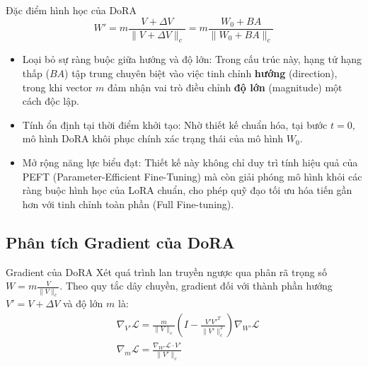 \documentclass[11pt,aspectratio=169]{beamer}
\begin{document}
\begin{frame}[t]{Đặc điểm hình học của DoRA}
$$W' = m \frac{V + \Delta V}{\|V + \Delta V\|_c} = m \frac{W_0 + BA}{\|W_0 + BA\|_c}$$
\begin{itemize}
\item Loại bỏ sự ràng buộc giữa hướng và độ lớn: Trong cấu trúc này, hạng tử hạng thấp ($BA$) tập trung chuyên biệt vào việc tinh chỉnh \textbf{hướng} (direction), trong khi vector $m$ đảm nhận vai trò điều chỉnh \textbf{độ lớn} (magnitude) một cách độc lập.

\item Tính ổn định tại thời điểm khởi tạo: Nhờ thiết kế chuẩn hóa, tại bước $t=0$, mô hình DoRA khôi phục chính xác trạng thái của mô hình $W_0$.

\item Mở rộng năng lực biểu đạt: Thiết kế này không chỉ duy trì tính hiệu quả của PEFT (Parameter-Efficient Fine-Tuning) mà còn giải phóng mô hình khỏi các ràng buộc hình học của LoRA chuẩn, cho phép quỹ đạo tối ưu hóa tiến gần hơn với tinh chỉnh toàn phần (Full Fine-tuning).
\end{itemize}

\end{frame}


\subsection{Phân tích Gradient của DoRA}
\begin{frame}[t]{Gradient của DoRA}
\footnotesize
Xét quá trình lan truyền ngược qua phân rã trọng số $W = m \frac{V}{\|V\|_c}$. Theo quy tắc dây chuyền, gradient đối với thành phần hướng $V'=V+\Delta V$ và độ lớn $m$ là:
    \begin{align}
        &\nabla_{V'} \mathcal{L} = \frac{m}{\|V\|_c} \left( I - \frac{V' V'^T}{\|V'\|_c^2} \right) \nabla_{W'} \mathcal{L} \label{eq:gradient-wrt-direction} \\
        &\nabla_{m} \mathcal{L} = \frac{ \nabla_{W'} \mathcal{L} \cdot V'}{\|V'\|_c} \label{eq:gradient-wrt-magnitude}
    \end{align}
\end{frame}
\end{document}
